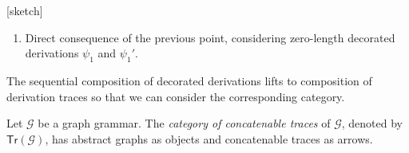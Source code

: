\documentclass[conference]{IEEEtran}
\renewenvironment{proof}{\begin{IEEEproof}}{\end{IEEEproof}}
\newcommand{\interval}[2][1]{\ensuremath{[{#1},{#2}]}}
\newcommand{\perm}{\sigma}
\newcommand{\tr}[1]{\ensuremath{\mathsf{Tr}({#1})}}
\newcommand{\graph}{\ensuremath{\mathsf{Graph}}}
\newcommand{\can}[1]{\ensuremath{\mathsf{C}({#1})}}
\newcommand{\col}[1]{\ensuremath{\mathsf{col}({#1})}}
\begin{document}
\begin{proof}{[sketch]}
\begin{enumerate}
\item Direct consequence of the previous point, considering zero-length decorated derivations $\psi_1$ and $\psi_1'$.
\end{enumerate}
%
\end{proof}



The sequential composition of decorated derivations lifts to
composition of derivation traces so that we can consider the
corresponding category.

\begin{definition}
  \label{de:abs-shift-cat}
   Let $\mathcal{G}$ be a graph grammar.
   The \emph{category of concatenable traces} of 
  $\mathcal{G}$, denoted by \tr{\mathcal{G}}, has abstract graphs as
  objects and concatenable traces as arrows.
\end{definition}
\end{document}
